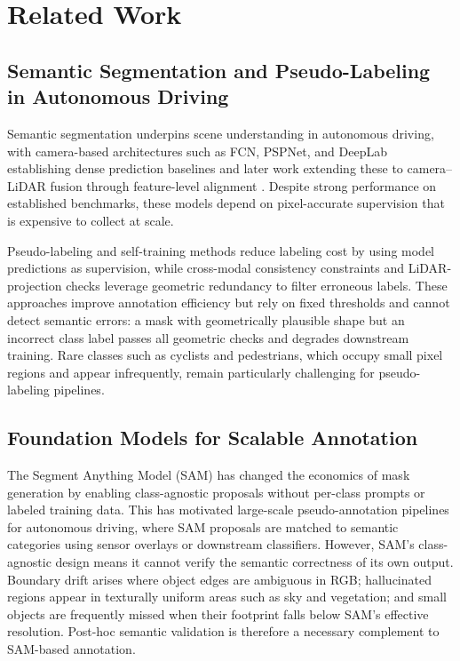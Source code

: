 \documentclass[conference]{IEEEtran}
\begin{document}
\section{Related Work}
\label{sec:related_work}

\subsection{Semantic Segmentation and Pseudo-Labeling in Autonomous Driving}

Semantic segmentation underpins scene understanding in autonomous driving, with camera-based architectures such as FCN, PSPNet, and DeepLab \cite{long2015fcn,zhao2017psp,chen2018deeplab} establishing dense prediction baselines and later work extending these to camera--LiDAR fusion through feature-level alignment \cite{valada2019selfsupervised,jaritz2019multimodal}. 
Despite strong performance on established benchmarks, these models depend on pixel-accurate supervision that is expensive to collect at scale.

Pseudo-labeling and self-training methods \cite{lee2013pseudo,zou2019confidence} reduce labeling cost by using model predictions as supervision, while cross-modal consistency constraints \cite{jaritz2020xmuda} and LiDAR-projection checks \cite{behley2019semantickitti,caesar2020nuscenes} leverage geometric redundancy to filter erroneous labels. 
These approaches improve annotation efficiency but rely on fixed thresholds and cannot detect semantic errors: a mask with geometrically plausible shape but an incorrect class label passes all geometric checks and degrades downstream training. 
Rare classes such as cyclists and pedestrians, which occupy small pixel regions and appear infrequently, remain particularly challenging for pseudo-labeling pipelines.

\subsection{Foundation Models for Scalable Annotation}

The Segment Anything Model (SAM) \cite{kirillov2023sam} has changed the economics of mask generation by enabling class-agnostic proposals without per-class prompts or labeled training data. 
This has motivated large-scale pseudo-annotation pipelines for autonomous driving, where SAM proposals are matched to semantic categories using sensor overlays or downstream classifiers. 
However, SAM's class-agnostic design means it cannot verify the semantic correctness of its own output. 
Boundary drift arises where object edges are ambiguous in RGB; hallucinated regions appear in texturally uniform areas such as sky and vegetation; and small objects are frequently missed when their footprint falls below SAM's effective resolution. 
Post-hoc semantic validation is therefore a necessary complement to SAM-based annotation.
\end{document}
